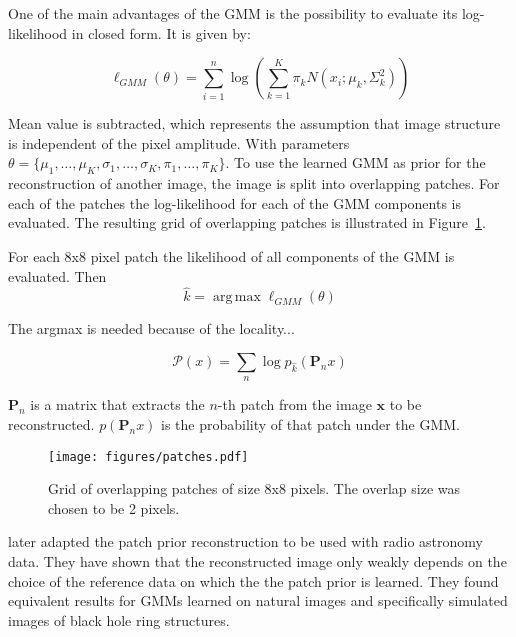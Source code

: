 \documentclass[twocolumn]{aastex631}
\DeclareMathOperator*{\argmax}{arg\,max}
\begin{document}
    One of the main advantages of the GMM is the possibility to evaluate its log-likelihood
    in closed form. It is given by:

    \begin{equation}
        \ell_{GMM}(\theta) = \sum_{i=1}^n \log \left( \sum_{k=1}^K \pi_k N(x_i;\mu_k, \Sigma_k^2) \right )
    \end{equation}

    Mean value is subtracted, which represents the assumption that image structure is independent
    of the pixel amplitude.
    With parameters $\theta = \{\mu_1,\ldots,\mu_K,\sigma_1,\ldots,\sigma_K,\pi_1,\ldots,\pi_K\}$.
    To use the learned GMM as prior for the reconstruction of another image, the image is split into
    overlapping patches. For each of the patches the log-likelihood for each of the GMM components is
    evaluated. The resulting grid of overlapping patches is illustrated in Figure~\ref{fig:patches}.

    For each 8x8 pixel patch the likelihood of all components of the GMM is evaluated. Then 
    \begin{equation}
        \hat{k} = \argmax{\ell_{GMM}(\theta)}
    \end{equation}

    The argmax is needed because of the locality...

    \begin{equation}
        \mathcal{P}(x) = \sum_n \log{p_{\hat{k}}(\mathbf{P}_n x)}
    \end{equation}

    $\mathbf{P}_n$ is a matrix that extracts the $n$-th patch
    from the image $\mathbf{x}$ to be reconstructed.
    $p(\mathbf{P}_n x)$ is the probability of that patch
    under the GMM.


    \begin{figure}[ht!]
        \begin{centering}
            \texttt{[image: figures/patches.pdf]}
            \caption{
                Grid of overlapping patches of size 8x8 pixels. The overlap size was chosen to be 2 pixels.
            }
            \label{fig:patches}
        \end{centering}
    \end{figure}

    \cite{Bouman2016} later adapted the patch prior reconstruction to be used
    with radio astronomy data.
    They have shown that the reconstructed image only weakly depends on the choice
    of the reference data on which the the patch prior is learned. They found
    equivalent results for GMMs learned on natural images and specifically
    simulated images of black hole ring structures.
\end{document}
